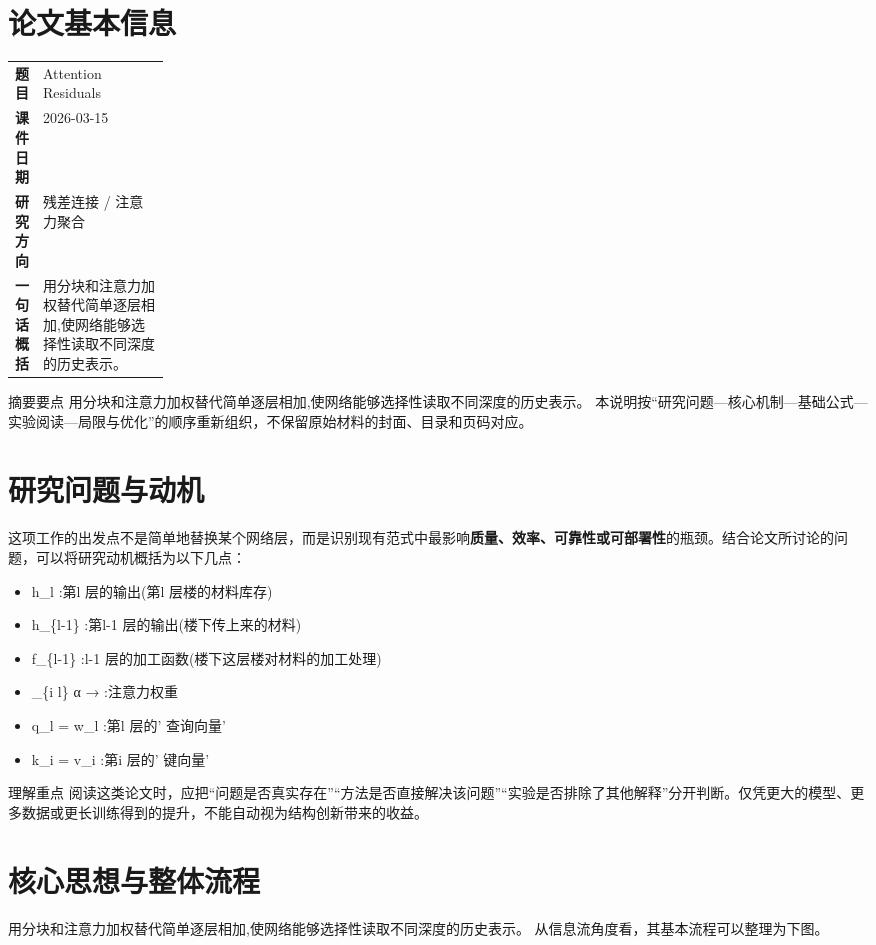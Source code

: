 \documentclass[UTF8,11pt,a4paper]{ctexart}
\newcommand{\term}[1]{\textbf{\textcolor{mainblue}{#1}}}
\begin{document}
\section{论文基本信息}
\begin{center}
\begin{tabularx}{0.94\linewidth}{>{\bfseries}p{0.18\linewidth}X}
\toprule
题目 & Attention Residuals\\
课件日期 & 2026-03-15\\
研究方向 & 残差连接 / 注意力聚合\\
一句话概括 & 用分块和注意力加权替代简单逐层相加,使网络能够选择性读取不同深度的历史表示。\\
\bottomrule
\end{tabularx}
\end{center}

\begin{infobox}{摘要要点}
用分块和注意力加权替代简单逐层相加,使网络能够选择性读取不同深度的历史表示。 本说明按“研究问题—核心机制—基础公式—实验阅读—局限与优化”的顺序重新组织，不保留原始材料的封面、目录和页码对应。
\end{infobox}

\section{研究问题与动机}
这项工作的出发点不是简单地替换某个网络层，而是识别现有范式中最影响\term{质量、效率、可靠性或可部署性}的瓶颈。结合论文所讨论的问题，可以将研究动机概括为以下几点：
\begin{itemize}
\item h\_l :第l 层的输出(第l 层楼的材料库存)
\item h\_\{l-1\} :第l-1 层的输出(楼下传上来的材料)
\item f\_\{l-1\} :l-1 层的加工函数(楼下这层楼对材料的加工处理)
\item \_\{i l\} α → :注意力权重
\item q\_l = w\_l :第l 层的' 查询向量'
\item k\_i = v\_i :第i 层的' 键向量'
\end{itemize}

\begin{notebox}{理解重点}
阅读这类论文时，应把“问题是否真实存在”“方法是否直接解决该问题”“实验是否排除了其他解释”分开判断。仅凭更大的模型、更多数据或更长训练得到的提升，不能自动视为结构创新带来的收益。
\end{notebox}

\section{核心思想与整体流程}
用分块和注意力加权替代简单逐层相加,使网络能够选择性读取不同深度的历史表示。 从信息流角度看，其基本流程可以整理为下图。
\end{document}
